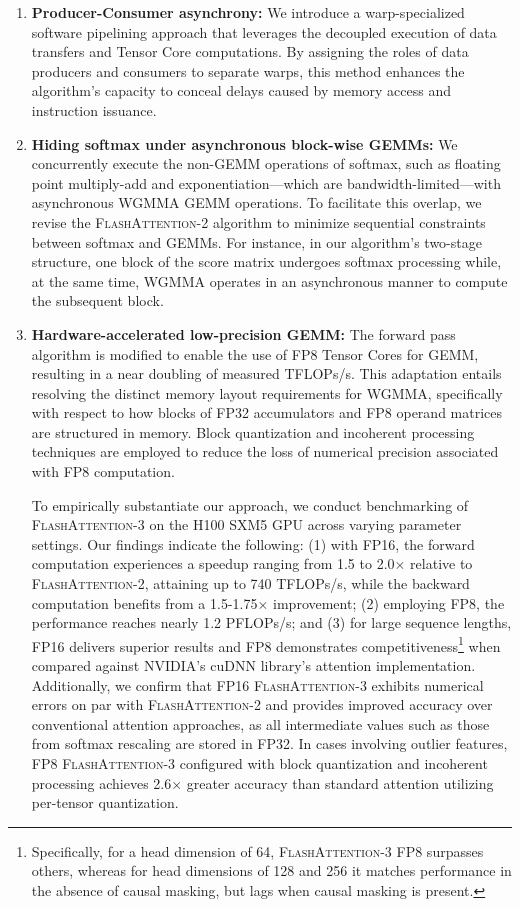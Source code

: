 \begin{enumerate}

\item \textbf{Producer-Consumer asynchrony:} We introduce a warp-specialized software pipelining approach that leverages the decoupled execution of data transfers and Tensor Core computations. By assigning the roles of data producers and consumers to separate warps, this method enhances the algorithm’s capacity to conceal delays caused by memory access and instruction issuance.

\item \textbf{Hiding softmax under asynchronous block-wise GEMMs:} We concurrently execute the non-GEMM operations of softmax, such as floating point multiply-add and exponentiation—which are bandwidth-limited—with asynchronous WGMMA GEMM operations. To facilitate this overlap, we revise the \textsc{FlashAttention-2} algorithm to minimize sequential constraints between softmax and GEMMs. For instance, in our algorithm’s two-stage structure, one block of the score matrix undergoes softmax processing while, at the same time, WGMMA operates in an asynchronous manner to compute the subsequent block.

\item \textbf{Hardware-accelerated low-precision GEMM:} The forward pass algorithm is modified to enable the use of FP8 Tensor Cores for GEMM, resulting in a near doubling of measured TFLOPs/s. This adaptation entails resolving the distinct memory layout requirements for WGMMA, specifically with respect to how blocks of FP32 accumulators and FP8 operand matrices are structured in memory. Block quantization and incoherent processing techniques are employed to reduce the loss of numerical precision associated with FP8 computation.

To empirically substantiate our approach, we conduct benchmarking of \textsc{FlashAttention-3} on the H100 SXM5 GPU across varying parameter settings. Our findings indicate the following: (1) with FP16, the forward computation experiences a speedup ranging from 1.5 to 2.0$\times$ relative to \textsc{FlashAttention-2}, attaining up to 740 TFLOPs/s, while the backward computation benefits from a 1.5-1.75$\times$ improvement; (2) employing FP8, the performance reaches nearly 1.2 PFLOPs/s; and (3) for large sequence lengths, FP16 delivers superior results and FP8 demonstrates competitiveness\footnote{Specifically, for a head dimension of 64, \textsc{FlashAttention-3} FP8 surpasses others, whereas for head dimensions of 128 and 256 it matches performance in the absence of causal masking, but lags when causal masking is present.} when compared against NVIDIA's cuDNN library’s attention implementation. Additionally, we confirm that FP16 \textsc{FlashAttention-3} exhibits numerical errors on par with \textsc{FlashAttention-2} and provides improved accuracy over conventional attention approaches, as all intermediate values such as those from softmax rescaling are stored in FP32. In cases involving outlier features, FP8 \textsc{FlashAttention-3} configured with block quantization and incoherent processing achieves 2.6$\times$ greater accuracy than standard attention utilizing per-tensor quantization.


\end{enumerate}
